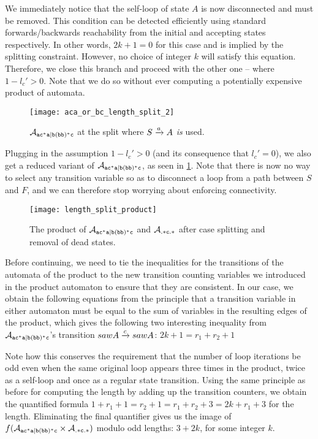 \documentclass[acmsmall,review,anonymous,screen]{acmart}\settopmatter{printfolios=true,printccs=false,printacmref=true}
\theoremstyle{definition}
\begin{document}
  We immediately notice that the self-loop of state $A$ is now disconnected and
  must be removed. This condition can be detected efficiently using standard
  forwards/backwards reachability from the initial and accepting states
  respectively. In other words, $2k+1 = 0$ for this case and is implied by the
  splitting constraint. However, no choice of integer $k$  will satisfy this
  equation. Therefore, we close this branch and proceed with the other one --
  where $1-l_c' > 0$. Note that we do so without ever computing a potentially
  expensive product of automata.

  \begin{figure}[t]
    \centering 
      \texttt{[image: aca\_or\_bc\_length\_split\_2]}
      \caption{$\mathcal{A}_{\mathtt{ac^*a|b(bb)^*c}}{}$ at the split where $S \xrightarrow{a} A$ \emph{is} used.}\label{fig:aca-or-bc-length-split-2}
    \end{figure}
  
Plugging in the assumption $1-l_c' > 0$ (and its consequence that $l_c' = 0$),
we also get a reduced variant of $\mathcal{A}_{\mathtt{ac^*a|b(bb)^*c}}$, as seen in
\cref{fig:aca-or-bc-length-split-2}. Note that there is now no way to select any
transition variable so as to disconnect a loop from a path between $S$ and $F$,
and we can therefore stop worrying about enforcing connectivity.


\begin{figure}[t]
  \centering 
    \texttt{[image: length\_split\_product]}
    \caption{The product of $\mathcal{A}_{\mathtt{ac^*a|b(bb)^*c}}$ and $\mathcal{A}_{\mathtt{.*c.*}}$ after
    case splitting and removal of dead states.}\label{fig:length-split-product}
  \end{figure}

Before continuing, we need to tie the inequalities for the transitions of the
automata of the product to the new transition counting variables we introduced
in the product automaton to ensure that they are consistent. In our case, we obtain the following equations from the principle that a transition variable in either automaton must be equal to the sum of variables in the resulting edges of the product, which gives the following two interesting inequality from $\mathcal{A}_{\mathtt{ac^*a|b(bb)^*c}}{}$'s transition $sawA \xrightarrow{c} sawA$: $2k + 1 = r_1 + r_2 + 1$

Note how this conserves the requirement that the number of loop iterations be
odd even when the same original loop appears three times in the product, twice
as a self-loop and once as a regular state transition. Using the same principle
as before for computing the length by adding up the transition counters, we
obtain the quantified formula $1 + r_1 + 1 = r_2 + 1 = r_1 + r_2 + 3 = 2k + r_1
+ 3$ for the length. Eliminating the final quantifier gives us the image of
$f(\mathcal{A}_{\mathtt{ac^*a|b(bb)^*c}} \times \mathcal{A}_{\mathtt{.*c.*}})$ modulo odd lengths: $3 + 2k$, for some
integer $k$.
\end{document}
